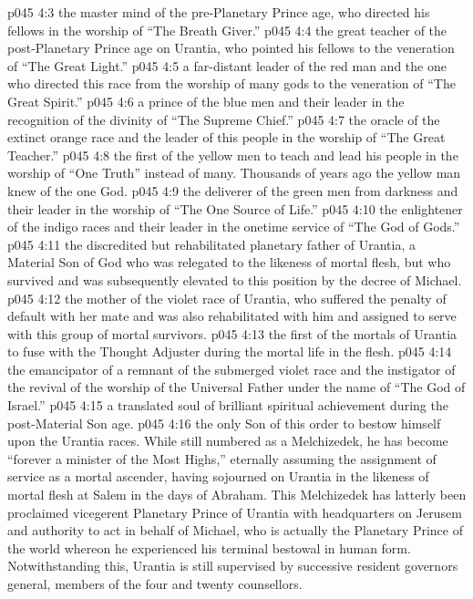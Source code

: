 \vs p045 4:3 \bibnobreakspace {} the master mind of the pre\hyp{}Planetary Prince age, who directed his fellows in the worship of “The Breath Giver.”
\vs p045 4:4 \bibnobreakspace {} the great teacher of the post\hyp{}Planetary Prince age on Urantia, who pointed his fellows to the veneration of “The Great Light.”
\vs p045 4:5 \bibnobreakspace {} a far\hyp{}distant leader of the red man and the one who directed this race from the worship of many gods to the veneration of “The Great Spirit.”
\vs p045 4:6 \bibnobreakspace {} a prince of the blue men and their leader in the recognition of the divinity of “The Supreme Chief.”
\vs p045 4:7 \bibnobreakspace {} the oracle of the extinct orange race and the leader of this people in the worship of “The Great Teacher.”
\vs p045 4:8 \bibnobreakspace {} the first of the yellow men to teach and lead his people in the worship of “One Truth” instead of many. Thousands of years ago the yellow man knew of the one God.
\vs p045 4:9 \bibnobreakspace {} the deliverer of the green men from darkness and their leader in the worship of “The One Source of Life.”
\vs p045 4:10 \bibnobreakspace {} the enlightener of the indigo races and their leader in the onetime service of “The God of Gods.”
\vs p045 4:11 \bibnobreakspace {} the discredited but rehabilitated planetary father of Urantia, a Material Son of God who was relegated to the likeness of mortal flesh, but who survived and was subsequently elevated to this position by the decree of Michael.
\vs p045 4:12 \bibnobreakspace {} the mother of the violet race of Urantia, who suffered the penalty of default with her mate and was also rehabilitated with him and assigned to serve with this group of mortal survivors.
\vs p045 4:13 \bibnobreakspace {} the first of the mortals of Urantia to fuse with the Thought Adjuster during the mortal life in the flesh.
\vs p045 4:14 \bibnobreakspace {} the emancipator of a remnant of the submerged violet race and the instigator of the revival of the worship of the Universal Father under the name of “The God of Israel.”
\vs p045 4:15 \bibnobreakspace {} a translated soul of brilliant spiritual achievement during the post\hyp{}Material Son age.
\vs p045 4:16 \bibnobreakspace {} the only Son of this order to bestow himself upon the Urantia races. While still numbered as a Melchizedek, he has become “forever a minister of the Most Highs,” eternally assuming the assignment of service as a mortal ascender, having sojourned on Urantia in the likeness of mortal flesh at Salem in the days of Abraham. This Melchizedek has latterly been proclaimed vicegerent Planetary Prince of Urantia with headquarters on Jerusem and authority to act in behalf of Michael, who is actually the Planetary Prince of the world whereon he experienced his terminal bestowal in human form. Notwithstanding this, Urantia is still supervised by successive resident governors general, members of the four and twenty counsellors.
